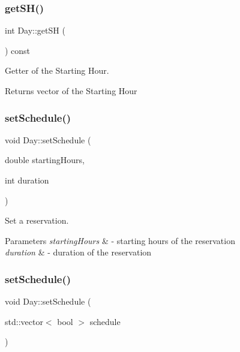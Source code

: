 \subsubsection{\texorpdfstring{get\+S\+H()}{getSH()}}
{\footnotesize\ttfamily int Day\+::get\+SH (\begin{DoxyParamCaption}{ }\end{DoxyParamCaption}) const}



Getter of the Starting Hour. 

\begin{DoxyReturn}{Returns}
vector of the Starting Hour 
\end{DoxyReturn}
\mbox{\label{class_day_ad3c8ca8c171a994c59788965166ae36b}} 
\subsubsection{\texorpdfstring{set\+Schedule()}{setSchedule()}\hspace{0.1cm}{\footnotesize\ttfamily [1/2]}}
{\footnotesize\ttfamily void Day\+::set\+Schedule (\begin{DoxyParamCaption}\item[{double}]{starting\+Hours,  }\item[{int}]{duration }\end{DoxyParamCaption})}



Set a reservation. 


\begin{DoxyParams}{Parameters}
{\em starting\+Hours} & -\/ starting hours of the reservation \\
\hline
{\em duration} & -\/ duration of the reservation \\
\hline
\end{DoxyParams}
\mbox{\label{class_day_aa46e0811bd26355979c6cf9f4e4b9df7}} 
\subsubsection{\texorpdfstring{set\+Schedule()}{setSchedule()}\hspace{0.1cm}{\footnotesize\ttfamily [2/2]}}
{\footnotesize\ttfamily void Day\+::set\+Schedule (\begin{DoxyParamCaption}\item[{std\+::vector$<$ bool $>$}]{schedule }\end{DoxyParamCaption})}



